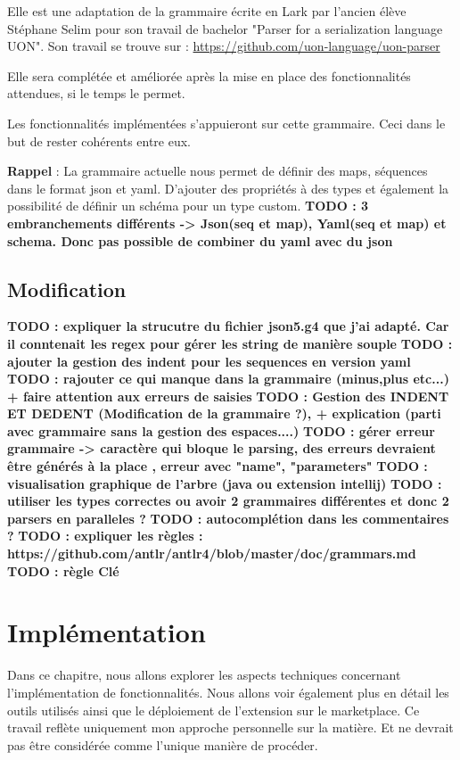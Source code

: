 \documentclass[
    iict, %
    il, %
]{heig-tb}
\begin{document}
Elle est une adaptation de la grammaire écrite en Lark par l'ancien élève Stéphane Selim pour son travail de bachelor "Parser for a serialization language UON". Son travail se trouve sur :
\href{https://github.com/uon-language/uon-parser}{https://github.com/uon-language/uon-parser}

Elle sera complétée et améliorée après la mise en place des fonctionnalités attendues, si le temps le permet.

Les fonctionnalités implémentées s'appuieront sur cette grammaire. Ceci dans le but de rester cohérents entre eux.

\textbf{Rappel} :
La grammaire actuelle nous permet de définir des maps, séquences dans le format json et yaml. D'ajouter des propriétés à des types et également la possibilité de définir un schéma pour un type custom.
\textbf{TODO : 3 embranchements différents -> Json(seq et map), Yaml(seq et map) et schema. Donc pas possible de combiner du yaml avec du json}

\section{Modification}
\textbf{TODO : expliquer la strucutre du fichier json5.g4 que j'ai adapté. Car il conntenait les regex pour gérer les string de manière souple}
\textbf{TODO : ajouter la gestion des indent pour les sequences en version yaml }
\textbf{TODO : rajouter ce qui manque dans la grammaire (minus,plus etc...) + faire attention aux erreurs de saisies}
\textbf{TODO : Gestion des INDENT ET DEDENT (Modification de la grammaire ?), + explication (parti avec grammaire sans la gestion des espaces....)}
\textbf{TODO : gérer erreur grammaire -> caractère qui bloque le parsing, des erreurs devraient être générés à la place , erreur avec "name", "parameters"}
\textbf{TODO : visualisation graphique de l'arbre (java ou extension intellij)}
\textbf{TODO : utiliser les types correctes ou avoir 2 grammaires différentes et donc 2 parsers en paralleles ?}
\textbf{TODO : autocomplétion dans les commentaires ?}
\textbf{TODO : expliquer les règles : https://github.com/antlr/antlr4/blob/master/doc/grammars.md}
\textbf{TODO : règle Clé}


\chapter{Implémentation}
Dans ce chapitre, nous allons explorer les aspects techniques concernant l'implémentation de fonctionnalités. Nous allons voir également plus en détail les outils utilisés ainsi que le déploiement de l'extension sur le marketplace.
Ce travail reflète uniquement mon approche personnelle sur la matière. Et ne devrait pas être considérée comme l'unique manière de procéder.
\end{document}
